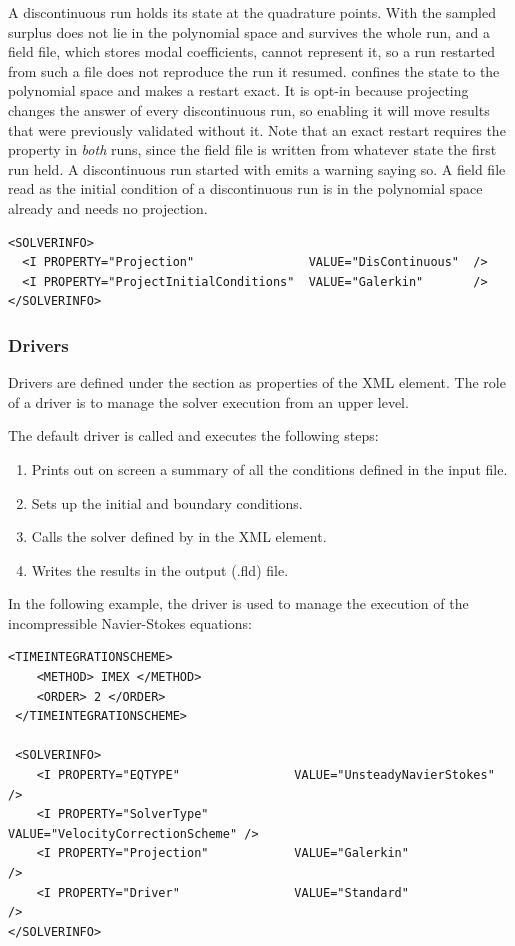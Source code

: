 A discontinuous run holds its state at the quadrature points. With
 the sampled surplus does not lie in the polynomial space and
survives the whole run, and a field file, which stores modal
coefficients, cannot represent it, so a run restarted from such a file
does not reproduce the run it resumed.  confines the
state to the polynomial space and makes a restart exact. It is opt-in
because projecting changes the answer of every discontinuous run, so
enabling it will move results that were previously validated without it.
Note that an exact restart requires the property in \emph{both} runs,
since the field file is written from whatever state the first run held.
A discontinuous run started with  emits a warning saying so.
A field file read as the initial condition of a discontinuous run is in
the polynomial space already and needs no projection.

\begin{lstlisting}[style=XMLStyle]
<SOLVERINFO>
  <I PROPERTY="Projection"                VALUE="DisContinuous"  />
  <I PROPERTY="ProjectInitialConditions"  VALUE="Galerkin"       />
</SOLVERINFO>
\end{lstlisting}

\subsubsection{Drivers}
Drivers are defined under the  section as properties of the 
 XML element. The role of a driver is to manage the solver 
execution from an upper level. 

The default driver is called  and executes the following steps:
\begin{enumerate}
\item Prints out on screen a summary of all the conditions defined in the input file.
\item Sets up the initial and boundary conditions.
\item Calls the solver defined by   in the  XML element.
\item Writes the results in the output (.fld) file.
\end{enumerate}

In the following example, the driver  is used to manage the 
execution of the incompressible Navier-Stokes equations:
\begin{lstlisting}[style=XMLStyle]
 <TIMEINTEGRATIONSCHEME>
    <METHOD> IMEX </METHOD>
    <ORDER> 2 </ORDER>
 </TIMEINTEGRATIONSCHEME>

 <SOLVERINFO>
    <I PROPERTY="EQTYPE"                VALUE="UnsteadyNavierStokes"     />
    <I PROPERTY="SolverType"            VALUE="VelocityCorrectionScheme" />
    <I PROPERTY="Projection"            VALUE="Galerkin"                 />
    <I PROPERTY="Driver"                VALUE="Standard"                 />
</SOLVERINFO>
\end{lstlisting}

